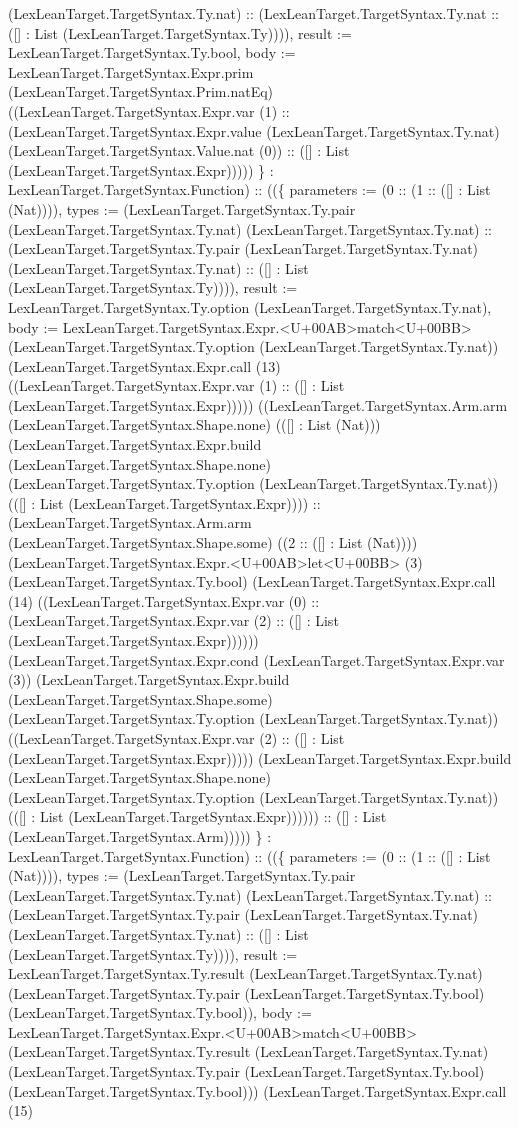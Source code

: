 \documentclass[11pt]{article}
\begin{document}
(LexLeanTarget.TargetSyntax.Ty.nat) :: (LexLeanTarget.TargetSyntax.Ty.nat :: ([] : List (LexLeanTarget.TargetSyntax.Ty)))), result := LexLeanTarget.TargetSyntax.Ty.bool, body := LexLeanTarget.TargetSyntax.Expr.prim (LexLeanTarget.TargetSyntax.Prim.natEq) ((LexLeanTarget.TargetSyntax.Expr.var (1) :: (LexLeanTarget.TargetSyntax.Expr.value (LexLeanTarget.TargetSyntax.Ty.nat) (LexLeanTarget.TargetSyntax.Value.nat (0)) :: ([] : List (LexLeanTarget.TargetSyntax.Expr))))) \} : LexLeanTarget.TargetSyntax.Function) :: ((\{ parameters := (0 :: (1 :: ([] : List (Nat)))), types := (LexLeanTarget.TargetSyntax.Ty.pair (LexLeanTarget.TargetSyntax.Ty.nat) (LexLeanTarget.TargetSyntax.Ty.nat) :: (LexLeanTarget.TargetSyntax.Ty.pair (LexLeanTarget.TargetSyntax.Ty.nat) (LexLeanTarget.TargetSyntax.Ty.nat) :: ([] : List (LexLeanTarget.TargetSyntax.Ty)))), result := LexLeanTarget.TargetSyntax.Ty.option (LexLeanTarget.TargetSyntax.Ty.nat), body := LexLeanTarget.TargetSyntax.Expr.<U+00AB>match<U+00BB> (LexLeanTarget.TargetSyntax.Ty.option (LexLeanTarget.TargetSyntax.Ty.nat)) (LexLeanTarget.TargetSyntax.Expr.call (13) ((LexLeanTarget.TargetSyntax.Expr.var (1) :: ([] : List (LexLeanTarget.TargetSyntax.Expr))))) ((LexLeanTarget.TargetSyntax.Arm.arm (LexLeanTarget.TargetSyntax.Shape.none) (([] : List (Nat))) (LexLeanTarget.TargetSyntax.Expr.build (LexLeanTarget.TargetSyntax.Shape.none) (LexLeanTarget.TargetSyntax.Ty.option (LexLeanTarget.TargetSyntax.Ty.nat)) (([] : List (LexLeanTarget.TargetSyntax.Expr)))) :: (LexLeanTarget.TargetSyntax.Arm.arm (LexLeanTarget.TargetSyntax.Shape.some) ((2 :: ([] : List (Nat)))) (LexLeanTarget.TargetSyntax.Expr.<U+00AB>let<U+00BB> (3) (LexLeanTarget.TargetSyntax.Ty.bool) (LexLeanTarget.TargetSyntax.Expr.call (14) ((LexLeanTarget.TargetSyntax.Expr.var (0) :: (LexLeanTarget.TargetSyntax.Expr.var (2) :: ([] : List (LexLeanTarget.TargetSyntax.Expr)))))) (LexLeanTarget.TargetSyntax.Expr.cond (LexLeanTarget.TargetSyntax.Expr.var (3)) (LexLeanTarget.TargetSyntax.Expr.build (LexLeanTarget.TargetSyntax.Shape.some) (LexLeanTarget.TargetSyntax.Ty.option (LexLeanTarget.TargetSyntax.Ty.nat)) ((LexLeanTarget.TargetSyntax.Expr.var (2) :: ([] : List (LexLeanTarget.TargetSyntax.Expr))))) (LexLeanTarget.TargetSyntax.Expr.build (LexLeanTarget.TargetSyntax.Shape.none) (LexLeanTarget.TargetSyntax.Ty.option (LexLeanTarget.TargetSyntax.Ty.nat)) (([] : List (LexLeanTarget.TargetSyntax.Expr)))))) :: ([] : List (LexLeanTarget.TargetSyntax.Arm))))) \} : LexLeanTarget.TargetSyntax.Function) :: ((\{ parameters := (0 :: (1 :: ([] : List (Nat)))), types := (LexLeanTarget.TargetSyntax.Ty.pair (LexLeanTarget.TargetSyntax.Ty.nat) (LexLeanTarget.TargetSyntax.Ty.nat) :: (LexLeanTarget.TargetSyntax.Ty.pair (LexLeanTarget.TargetSyntax.Ty.nat) (LexLeanTarget.TargetSyntax.Ty.nat) :: ([] : List (LexLeanTarget.TargetSyntax.Ty)))), result := LexLeanTarget.TargetSyntax.Ty.result (LexLeanTarget.TargetSyntax.Ty.nat) (LexLeanTarget.TargetSyntax.Ty.pair (LexLeanTarget.TargetSyntax.Ty.bool) (LexLeanTarget.TargetSyntax.Ty.bool)), body := LexLeanTarget.TargetSyntax.Expr.<U+00AB>match<U+00BB> (LexLeanTarget.TargetSyntax.Ty.result (LexLeanTarget.TargetSyntax.Ty.nat) (LexLeanTarget.TargetSyntax.Ty.pair (LexLeanTarget.TargetSyntax.Ty.bool) (LexLeanTarget.TargetSyntax.Ty.bool))) (LexLeanTarget.TargetSyntax.Expr.call (15) 
\end{document}
